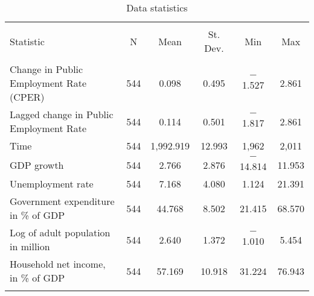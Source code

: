 
\begin{table}[!htbp] \centering 
  \caption{Data statistics} 
  \label{} 
\footnotesize 
\begin{tabular}{@{\extracolsep{5pt}}lccccc} 
\\[-1.8ex]\hline 
\hline \\[-1.8ex] 
Statistic & \multicolumn{1}{c}{N} & \multicolumn{1}{c}{Mean} & \multicolumn{1}{c}{St. Dev.} & \multicolumn{1}{c}{Min} & \multicolumn{1}{c}{Max} \\ 
\hline \\[-1.8ex] 
Change in Public Employment Rate (CPER) & 544 & 0.098 & 0.495 & $-$1.527 & 2.861 \\ 
Lagged change in Public Employment Rate & 544 & 0.114 & 0.501 & $-$1.817 & 2.861 \\ 
Time & 544 & 1,992.919 & 12.993 & 1,962 & 2,011 \\ 
GDP growth & 544 & 2.766 & 2.876 & $-$14.814 & 11.953 \\ 
Unemployment rate & 544 & 7.168 & 4.080 & 1.124 & 21.391 \\ 
Government expenditure in \% of GDP & 544 & 44.768 & 8.502 & 21.415 & 68.570 \\ 
Log of adult population in million & 544 & 2.640 & 1.372 & $-$1.010 & 5.454 \\ 
Household net income, in \% of GDP & 544 & 57.169 & 10.918 & 31.224 & 76.943 \\ 
\hline \\[-1.8ex] 
\end{tabular} 
\end{table} 
